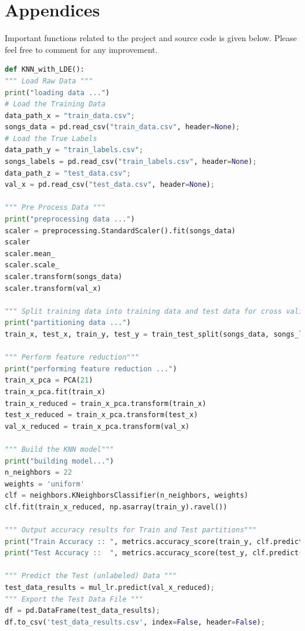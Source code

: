 \documentclass[journal]{IEEEtran}
\begin{document}
\section{Appendices}
Important functions related to the project and source code is given below. Please feel free to comment for any improvement.
\begin{lstlisting}[language=Python, caption= KNN Clustering with Low Dimensional Embedding]
def KNN_with_LDE():
""" Load Raw Data """
print("loading data ...")
# Load the Training Data
data_path_x = "train_data.csv";
songs_data = pd.read_csv("train_data.csv", header=None);
# Load the True Labels
data_path_y = "train_labels.csv";
songs_labels = pd.read_csv("train_labels.csv", header=None);
data_path_z = "test_data.csv";
val_x = pd.read_csv("test_data.csv", header=None);

""" Pre Process Data """
print("preprocessing data ...")
scaler = preprocessing.StandardScaler().fit(songs_data)
scaler
scaler.mean_
scaler.scale_
scaler.transform(songs_data)
scaler.transform(val_x)

""" Split training data into training data and test data for cross validation """
print("partitioning data ...")
train_x, test_x, train_y, test_y = train_test_split(songs_data, songs_labels, train_size=0.8, random_state=0);

""" Perform feature reduction"""
print("performing feature reduction ...")
train_x_pca = PCA(21)
train_x_pca.fit(train_x)
train_x_reduced = train_x_pca.transform(train_x)
test_x_reduced = train_x_pca.transform(test_x)
val_x_reduced = train_x_pca.transform(val_x)

""" Build the KNN model"""
print("building model...")
n_neighbors = 22
weights = 'uniform'
clf = neighbors.KNeighborsClassifier(n_neighbors, weights)
clf.fit(train_x_reduced, np.asarray(train_y).ravel())

""" Output accuracy results for Train and Test partitions"""
print("Train Accuracy :: ", metrics.accuracy_score(train_y, clf.predict(train_x_reduced)));
print("Test Accuracy ::  ", metrics.accuracy_score(test_y, clf.predict(test_x_reduced)));

""" Predict the Test (unlabeled) Data """
test_data_results = mul_lr.predict(val_x_reduced);
""" Export the Test Data File """
df = pd.DataFrame(test_data_results);
df.to_csv('test_data_results.csv', index=False, header=False);
\end{lstlisting}
\end{document}
